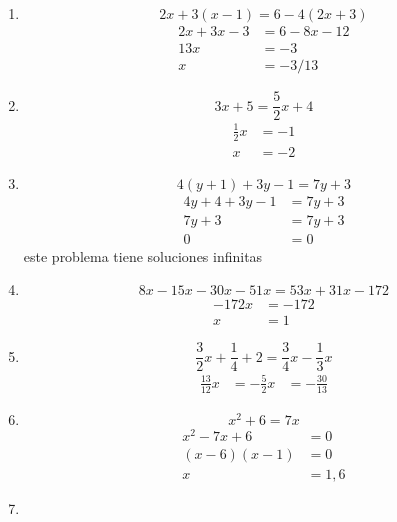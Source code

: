 \documentclass[12pt,letterpaper]{report}
\begin{document}
\begin{enumerate}
\begin{align*}
    10x&=-8\\
    x&=-8/10
\end{align*}
\item \begin{equation*}
    2x+3(x-1)=6-4(2x+3)
\end{equation*}
\begin{align*}
    2x+3x-3&=6-8x-12\\
    13x&=-3\\
    x&=-3/13
\end{align*}
\item \begin{equation*}
    3x+5=\frac{5}{2}x+4
\end{equation*}
\begin{align*}
    \frac{1}{2}x&=-1\\
    x&=-2
\end{align*}
\item \begin{equation*}
    4(y+1)+3y-1=7y+3
\end{equation*}
\begin{align*}
    4y+4+3y-1&=7y+3\\
    7y+3&=7y+3\\
    0&=0
\end{align*}
este problema tiene soluciones infinitas
\item \begin{equation*}
    8x-15x-30x-51x=53x+31x-172
\end{equation*}
\begin{align*}
    -172x&=-172\\
    x&=1
\end{align*}
\item \begin{equation*}
    \frac{3}{2}x+\frac{1}{4}+2=\frac{3}{4}x-\frac{1}{3}x
\end{equation*}
\begin{align*}
    \frac{13}{12}x&=-\frac{5}{2}
    x&= -\frac{30}{13}
\end{align*}
\item \begin{equation*}
    x^2+6=7x
\end{equation*}
\begin{align*}
    x^2-7x+6&=0\\
    (x-6)(x-1)&=0\\
    x&=1,6
\end{align*}
\item \begin{equation*}

\end{equation*}
\end{enumerate}
\end{document}
